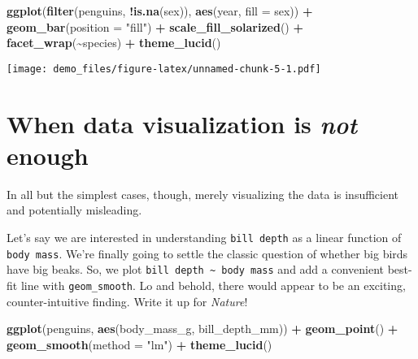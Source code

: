 \documentclass[
]{article}
\newenvironment{Shaded}{\begin{snugshade}}{\end{snugshade}}
\newcommand{\AttributeTok}[1]{\textcolor[rgb]{0.13,0.29,0.53}{#1}}
\newcommand{\FunctionTok}[1]{\textcolor[rgb]{0.13,0.29,0.53}{\textbf{#1}}}
\newcommand{\NormalTok}[1]{#1}
\newcommand{\SpecialCharTok}[1]{\textcolor[rgb]{0.81,0.36,0.00}{\textbf{#1}}}
\newcommand{\StringTok}[1]{\textcolor[rgb]{0.31,0.60,0.02}{#1}}
\begin{document}
\begin{Shaded}
\begin{Highlighting}[]
\FunctionTok{ggplot}\NormalTok{(}\FunctionTok{filter}\NormalTok{(penguins, }\SpecialCharTok{!}\FunctionTok{is.na}\NormalTok{(sex)), }\FunctionTok{aes}\NormalTok{(year, }\AttributeTok{fill =}\NormalTok{ sex)) }\SpecialCharTok{+}
  \FunctionTok{geom\_bar}\NormalTok{(}\AttributeTok{position =} \StringTok{"fill"}\NormalTok{) }\SpecialCharTok{+}
  \FunctionTok{scale\_fill\_solarized}\NormalTok{() }\SpecialCharTok{+}
  \FunctionTok{facet\_wrap}\NormalTok{(}\SpecialCharTok{\textasciitilde{}}\NormalTok{species) }\SpecialCharTok{+}
  \FunctionTok{theme\_lucid}\NormalTok{()}
\end{Highlighting}
\end{Shaded}

\texttt{[image: demo\_files/figure-latex/unnamed-chunk-5-1.pdf]}

\hypertarget{when-data-visualization-is-not-enough}{%
\section{\texorpdfstring{When data visualization is \emph{not}
enough}{When data visualization is not enough}}\label{when-data-visualization-is-not-enough}}

In all but the simplest cases, though, merely visualizing the data is
insufficient and potentially misleading.

Let's say we are interested in understanding \texttt{bill\ depth} as a
linear function of \texttt{body\ mass}. We're finally going to settle
the classic question of whether big birds have big beaks. So, we plot
\texttt{bill\ depth\ \textasciitilde{}\ body\ mass} and add a convenient
best-fit line with \texttt{geom\_smooth}. Lo and behold, there would
appear to be an exciting, counter-intuitive finding. Write it up for
\emph{Nature}!

\begin{Shaded}
\begin{Highlighting}[]
\FunctionTok{ggplot}\NormalTok{(penguins, }\FunctionTok{aes}\NormalTok{(body\_mass\_g, bill\_depth\_mm)) }\SpecialCharTok{+}
  \FunctionTok{geom\_point}\NormalTok{() }\SpecialCharTok{+}
  \FunctionTok{geom\_smooth}\NormalTok{(}\AttributeTok{method =} \StringTok{"lm"}\NormalTok{) }\SpecialCharTok{+}
  \FunctionTok{theme\_lucid}\NormalTok{()}
\end{Highlighting}
\end{Shaded}
\end{document}
